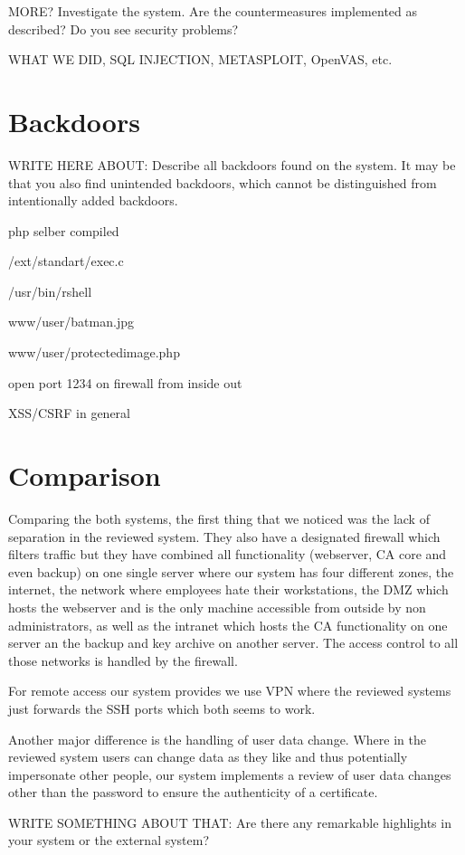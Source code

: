 \documentclass{report}
\begin{document}
MORE? Investigate the system. Are the countermeasures implemented as described? Do you see security problems?


WHAT WE DID, SQL INJECTION, METASPLOIT, OpenVAS, etc.

\section{Backdoors}

WRITE HERE ABOUT: 
Describe all backdoors found on the system. 
It may be that you also find unintended backdoors, which cannot be distinguished from intentionally added backdoors.


php selber compiled


/ext/standart/exec.c


/usr/bin/rshell


www/user/batman.jpg


www/user/protectedimage.php


open port 1234 on firewall from inside out


XSS/CSRF in general


\section{Comparison}

Comparing the both systems, the first thing that we noticed was the lack of separation in the reviewed system. They also have a designated firewall which filters traffic but they have combined all functionality (webserver, CA core and even backup) on one single server where our system has four different zones, the internet, the network where employees hate their workstations, the DMZ which hosts the webserver and is the only machine accessible from outside by non administrators, as well as the intranet which hosts the CA functionality on one server an the backup and key archive on another server. The access control to all those networks is handled by the firewall.

For remote access our system provides we use VPN where the reviewed systems just forwards the SSH ports which both seems to work.

Another major difference is the handling of user data change. Where in the reviewed system users can change data as they like and thus potentially impersonate other people, our system implements a review of user data changes other than the password to ensure the authenticity of a certificate.

WRITE SOMETHING ABOUT THAT: Are there any remarkable highlights in your system or the external system?
\end{document}
